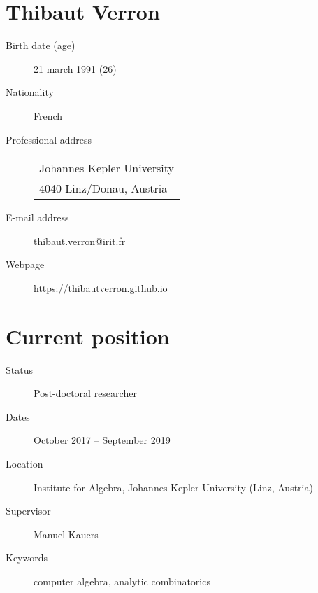 \documentclass{scrartcl}
\title{}
\date{}
\makeatletter
\newcommand{\pbox}[2][l]{%
  \begin{tabular}[t]{@{}#1@{}}#2\end{tabular}%
}
\makeatother
\begin{document}
\newcommand{\structure}[1]{\textbf{\textsf{#1}}}

\section*{\huge Thibaut Verron}
\label{sec:Inform-pers}


\begin{description}
  \item[Birth date (age)] 21 march 1991 (26)
  \item[Nationality] French
  \item[Professional address]
  \begin{tabular}[t]{l}
    Johannes Kepler University\\
    4040 Linz/Donau, Austria
  \end{tabular}

  \item[E-mail address] \url{thibaut.verron@irit.fr}
  \item[Webpage] \url{https://thibautverron.github.io}
\end{description}

\section*{Current position}
\label{sec:Current-position}

\begin{description}
  \item[Status] Post-doctoral researcher
  \item[Dates] October 2017 -- September 2019
  \item[Location] Institute for Algebra, Johannes Kepler University (Linz, Austria)
  \item[Supervisor] Manuel Kauers
  \item[Keywords] computer algebra, analytic combinatorics
\end{description}
\end{document}

